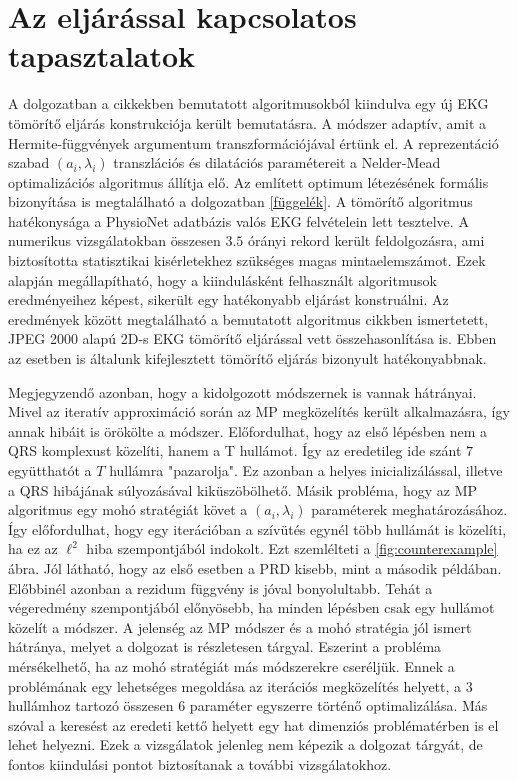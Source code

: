 \documentclass[oneside,titlepage,12pt,a4paper]{report}
\begin{document}
\section{Az eljárással kapcsolatos tapasztalatok}

A dolgozatban a \cite{hexp3, hexp5} cikkekben bemutatott algoritmusokból kiindulva egy új EKG tömörítő eljárás konstrukciója került bemutatásra. A módszer adaptív, amit a Hermite-függvények argumentum transzformációjával értünk el. A reprezentáció szabad $(a_i,\lambda_i)$ transzlációs és dilatációs paramétereit a Nelder-Mead optimalizációs algoritmus állítja elő. Az említett optimum létezésének formális bizonyítása is megtalálható a dolgozatban \ref{függelék}. A tömörítő algoritmus hatékonysága a PhysioNet adatbázis valós EKG felvételein lett tesztelve. A numerikus vizsgálatokban összesen $3.5$ órányi rekord került feldolgozásra, ami biztosította statisztikai kisérletekhez szükséges magas mintaelemszámot. Ezek alapján megállapítható, hogy a kiindulásként felhasznált \cite{hexp3, hexp5} algoritmusok eredményeihez képest, sikerült egy hatékonyabb eljárást konstruálni. Az eredmények között megtalálható a bemutatott algoritmus \cite{jpeg2000ECG} cikkben ismertetett, JPEG 2000 alapú 2D-s EKG tömörítő eljárással vett összehasonlítása is. Ebben az esetben is általunk kifejlesztett tömörítő eljárás bizonyult hatékonyabbnak.

Megjegyzendő azonban, hogy a kidolgozott módszernek is vannak hátrányai. Mivel az iteratív approximáció során az MP megközelítés került alkalmazásra, így annak hibáit is örökölte a módszer. Előfordulhat, hogy az első lépésben nem a QRS komplexust közelíti, hanem a T hullámot. Így az eredetileg ide szánt $7$ együtthatót a $T$ hullámra "pazarolja". Ez azonban a helyes inicializálással, illetve a QRS hibájának súlyozásával kiküszöbölhető. Másik probléma, hogy az MP algoritmus egy mohó stratégiát követ a $(a_i,\lambda_i)$ paraméterek meghatározásához. Így előfordulhat, hogy egy iterációban a szívütés egynél több hullámát is közelíti, ha ez az $\ell^2$ hiba szempontjából indokolt. Ezt szemlélteti a \ref{fig:counterexample} ábra. Jól látható, hogy az első esetben a PRD kisebb, mint a második példában. Előbbinél azonban a rezidum függvény is jóval bonyolultabb. Tehát a végeredmény szempontjából előnyösebb, ha minden lépésben csak egy hullámot közelít a módszer. A jelenség az MP módszer és a mohó stratégia jól ismert hátránya, melyet a \cite{bpurs} dolgozat is részletesen tárgyal. Eszerint a probléma mérsékelhető, ha az mohó stratégiát más módszerekre cseréljük. Ennek a problémának egy lehetséges megoldása az iterációs megközelítés helyett, a $3$ hullámhoz tartozó összesen $6$ paraméter egyszerre történő optimalizálása. Más szóval a keresést az eredeti kettő helyett egy hat dimenziós problématérben is el lehet helyezni. Ezek a vizsgálatok jelenleg nem képezik a dolgozat tárgyát, de fontos kiindulási pontot biztosítanak a további vizsgálatokhoz.
 
\end{document}
